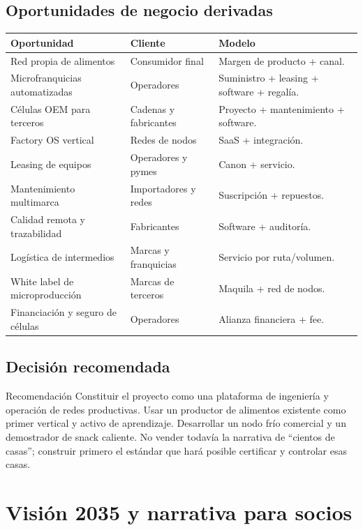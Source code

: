 \documentclass[11pt,a4paper]{article}
\begin{document}
\subsection{Oportunidades de negocio derivadas}
{\small
\begin{xltabular}{\textwidth}{@{}P{4.4cm}P{3.6cm}L@{}}
\toprule
\textbf{Oportunidad} & \textbf{Cliente} & \textbf{Modelo}\\ \midrule
\endhead
Red propia de alimentos & Consumidor final & Margen de producto + canal.\\
Microfranquicias automatizadas & Operadores & Suministro + leasing + software + regalía.\\
Células OEM para terceros & Cadenas y fabricantes & Proyecto + mantenimiento + software.\\
Factory OS vertical & Redes de nodos & SaaS + integración.\\
Leasing de equipos & Operadores y pymes & Canon + servicio.\\
Mantenimiento multimarca & Importadores y redes & Suscripción + repuestos.\\
Calidad remota y trazabilidad & Fabricantes & Software + auditoría.\\
Logística de intermedios & Marcas y franquicias & Servicio por ruta/volumen.\\
White label de microproducción & Marcas de terceros & Maquila + red de nodos.\\
Financiación y seguro de células & Operadores & Alianza financiera + fee.\\
\bottomrule
\end{xltabular}}

\subsection{Decisión recomendada}
\begin{caja}{Recomendación}
Constituir el proyecto como una plataforma de ingeniería y operación de redes productivas. Usar un
productor de alimentos existente como primer vertical y activo de aprendizaje. Desarrollar un nodo frío
comercial y un demostrador de snack caliente. No vender todavía la narrativa de “cientos de casas”;
construir primero el estándar que hará posible certificar y controlar esas casas.
\end{caja}

\section{Visión 2035 y narrativa para socios}
\end{document}
